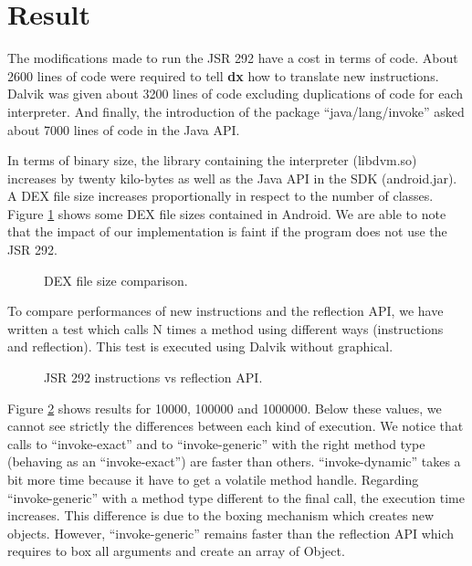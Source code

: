 \documentclass{sig-alternate}
\def \DALVIK{Dalvik\xspace}
\def \Jsr{JSR\xspace}
\def \JSR{\Jsr 292\xspace}
\newcommand{\fixme}[1]{{\color{red}FIXME #1}}
\begin{document}
\section{Result}
 \label{result}

  The modifications made to run the \JSR have a cost in terms of code.
  About 2600 lines of code were required to tell {\bf dx} how to translate new instructions.
  Dalvik was given about 3200 lines of code excluding duplications of code for each interpreter.
  And finally, the introduction of the package ``java/lang/invoke'' asked about 7000 lines of code in the Java API.


  In terms of binary size, the library containing the interpreter (libdvm.so) increases by twenty kilo-bytes as well as the Java API in the SDK (android.jar).
  A DEX file size increases proportionally in respect to the number of classes.
  Figure \ref{Rsize} shows some DEX file sizes contained in Android.
  We are able to note that the impact of our implementation is faint if the program does not use the \JSR.

  \begin{figure}[h]
    \dataset
    \resizebox{\linewidth}{!}{}
    \caption{DEX file size comparison.}
    \label{Rsize}
  \end{figure}

  To compare performances of new instructions and the reflection API,
  we have written a test which calls N times a method using different ways (instructions and reflection).
  This test is executed using \DALVIK without graphical.

  \begin{figure}[!h]
    \resizebox{\linewidth}{!}{}
    \caption{JSR 292 instructions vs reflection API.}
    \label{Rinvoke}
  \end{figure}

  Figure \ref{Rinvoke} shows results for 10000, 100000 and 1000000.
  Below these values, we cannot see strictly the differences between each kind of execution.
  We notice that calls to ``invoke-exact'' and to ``invoke-generic'' with the right method type (behaving as an ``invoke-exact'') are faster than others.
  ``invoke-dynamic'' takes a bit more time because it have to get a volatile method handle.
  Regarding ``invoke-generic'' with a method type different to the final call, the execution time increases.
  This difference is due to the boxing mechanism which creates new objects.
  However, ``invoke-generic'' remains faster than the reflection API which requires to box all arguments and create an array of Object.\\
  
\end{document}
